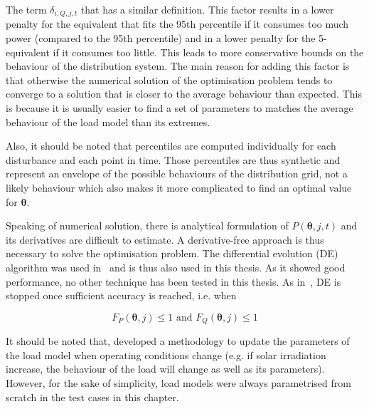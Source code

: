 The term \(\delta_{i, Q, j, t}\) that has a similar definition. This factor results in a lower penalty for the equivalent that fits the 95th percentile if it consumes too much power (compared to the 95th percentile) and in a lower penalty for the 5-equivalent if it consumes too little. This leads to more conservative bounds on the behaviour of the distribution system. The main reason for adding this factor is that otherwise the numerical solution of the optimisation problem tends to converge to a solution that is closer to the average behaviour than expected. This is because it is usually easier to find a set of parameters to matches the average behaviour of the load model than its extremes.

Also, it should be noted that percentiles are computed individually for each disturbance and each point in time. Those percentiles are thus synthetic and represent an envelope of the possible behaviours of the distribution grid, not a likely behaviour which also makes it more complicated to find an optimal value for \(\bm{\theta}\).

Speaking of numerical solution, there is analytical formulation of \(P(\bm{\theta}, j, t)\) and its derivatives are difficult to estimate. A derivative-free approach is thus necessary to solve the optimisation problem. The differential evolution (DE) algorithm was used in~\cite{ChaspierreThesis, ChaspierrePaper} and is thus also used in this thesis. As it showed good performance, no other technique has been tested in this thesis. As in~\cite{ChaspierreThesis, ChaspierrePaper}, DE is stopped once sufficient accuracy is reached, i.e. when

\begin{equation}
    \label{eq:equivalent_stop}
    F_P(\bm{\theta}, j) \leq 1 \text{ and } F_Q(\bm{\theta}, j) \leq 1
\end{equation}

It should be noted that, \cite{ChaspierreThesis} developed a methodology to update the parameters of the load model when operating conditions change (e.g. if solar irradiation increase, the behaviour of the load will change as well as its parameters). However, for the sake of simplicity, load models were always parametrised from scratch in the test cases in this chapter.


